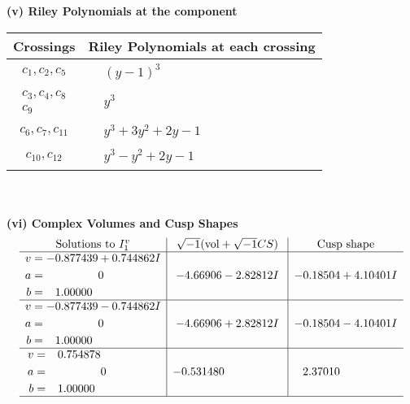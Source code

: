 \documentclass[1p]{elsarticle_modified}
\theoremstyle{definition}
\newcommand{\I}{\sqrt{-1}}
\begin{document}
\newpage\renewcommand{\arraystretch}{1}
\flushleft \textbf{(v) Riley Polynomials at the component}\newline \\
\begin{tabular}{m{50pt}|m{274pt}}
Crossings & \hspace{64pt}Riley Polynomials at each crossing \\
\hline $$\begin{aligned}c_{1},c_{2},c_{5}\end{aligned}$$&$\begin{aligned}
&(y-1)^3
\end{aligned}$\\
\hline $$\begin{aligned}c_{3},c_{4},c_{8}\\c_{9}\end{aligned}$$&$\begin{aligned}
&y^3
\end{aligned}$\\
\hline $$\begin{aligned}c_{6},c_{7},c_{11}\end{aligned}$$&$\begin{aligned}
&y^3+3 y^2+2 y-1
\end{aligned}$\\
\hline $$\begin{aligned}c_{10},c_{12}\end{aligned}$$&$\begin{aligned}
&y^3- y^2+2 y-1
\end{aligned}$\\
\hline
\end{tabular}\\~\\
\newpage\flushleft \textbf{(vi) Complex Volumes and Cusp Shapes}
$$\begin{array}{c|c|c}  
\text{Solutions to }I^v_{1}& \I (\text{vol} + \sqrt{-1}CS) & \text{Cusp shape}\\
 \hline 
\begin{aligned}
v &= -0.877439 + 0.744862 I \\
a &= \phantom{-0.000000 } 0 \\
b &= \phantom{-}1.00000\phantom{ +0.000000I}\end{aligned}
 & -4.66906 - 2.82812 I & -0.18504 + 4.10401 I \\ \hline\begin{aligned}
v &= -0.877439 - 0.744862 I \\
a &= \phantom{-0.000000 } 0 \\
b &= \phantom{-}1.00000\phantom{ +0.000000I}\end{aligned}
 & -4.66906 + 2.82812 I & -0.18504 - 4.10401 I \\ \hline\begin{aligned}
v &= \phantom{-}0.754878\phantom{ +0.000000I} \\
a &= \phantom{-0.000000 } 0 \\
b &= \phantom{-}1.00000\phantom{ +0.000000I}\end{aligned}
 & -0.531480\phantom{ +0.000000I} & \phantom{-}2.37010\phantom{ +0.000000I}\\
 \hline 
 \end{array}$$\newpage
\end{document}
